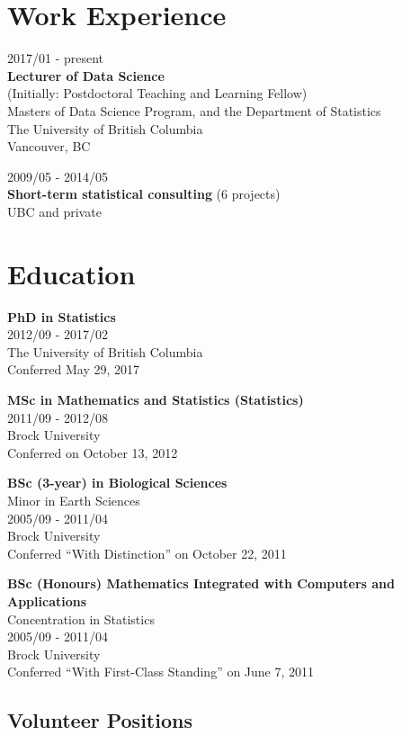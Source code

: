 \documentclass[]{book}
\begin{document}
\hypertarget{work-experience}{%
\section{Work Experience}\label{work-experience}}

2017/01 - present\\
\textbf{Lecturer of Data Science}\\
(Initially: Postdoctoral Teaching and Learning Fellow)\\
Masters of Data Science Program, and the Department of Statistics\\
The University of British Columbia\\
Vancouver, BC

2009/05 - 2014/05\\
\textbf{Short-term statistical consulting} (6 projects)\\
UBC and private

\hypertarget{education}{%
\section{Education}\label{education}}

\textbf{PhD in Statistics}\\
2012/09 - 2017/02\\
The University of British Columbia\\
Conferred May 29, 2017

\textbf{MSc in Mathematics and Statistics (Statistics)}\\
2011/09 - 2012/08\\
Brock University\\
Conferred on October 13, 2012

\textbf{BSc (3-year) in Biological Sciences}\\
Minor in Earth Sciences\\
2005/09 - 2011/04\\
Brock University\\
Conferred ``With Distinction'' on October 22, 2011

\textbf{BSc (Honours) Mathematics Integrated with Computers and Applications}\\
Concentration in Statistics\\
2005/09 - 2011/04\\
Brock University\\
Conferred ``With First-Class Standing'' on June 7, 2011

\hypertarget{volunteer-positions}{%
\subsection{Volunteer Positions}\label{volunteer-positions}}
\end{document}
